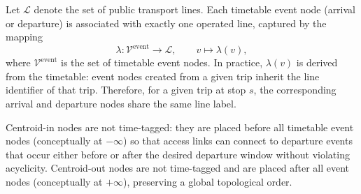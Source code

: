 \begin{definition}
Let $\mathcal{L}$ denote the set of public transport lines. Each timetable event node
(arrival or departure) is associated with exactly one operated line, captured by the mapping
\[
\lambda:\mathcal{V}^{\mathrm{event}}\rightarrow\mathcal{L},
\qquad v\mapsto \lambda(v),
\]
where $\mathcal{V}^{\mathrm{event}}$ is the set of timetable event nodes.
In practice, $\lambda(v)$ is derived from the timetable: event nodes created from a given
trip inherit the line identifier of that trip. Therefore, for a given trip at stop $s$,
the corresponding arrival and departure nodes share the same line label.
\end{definition}

Centroid-in nodes are not time-tagged: they are placed before all timetable
event nodes (conceptually at $-\infty$) so that access links can connect to
departure events that occur either before or after the desired departure window
without violating acyclicity. Centroid-out nodes are not time-tagged and
are placed after all event nodes (conceptually at $+\infty$), preserving a global
topological order.

